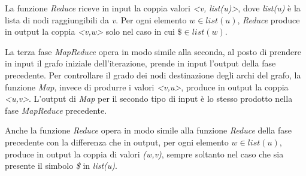 \documentclass[LaM,binding=0.6cm]{sapthesis}
\begin{document}
La funzione \textit{Reduce} riceve in input la coppia valori \textit{<v, list(u)>}, dove \textit{list(u)} è la lista di nodi raggiungibili da \textit{v}. Per ogni elemento \textit{$w \in list(u)$}, \textit{Reduce} produce in output la coppia \textit{<v,w>} solo nel caso in cui $\$ \in list(w)$. 

La terza fase \textit{MapReduce} opera in modo simile alla seconda, al posto di prendere in input il grafo iniziale dell'iterazione, prende in input l'output della fase precedente. Per controllare il grado dei nodi destinazione degli archi del grafo, la funzione \textit{Map}, invece di produrre i valori \textit{<v,u>}, produce in output la coppia \textit{<u,v>}. L'output di \textit{Map} per il secondo tipo di input è lo stesso prodotto nella fase \textit{MapReduce} precedente.

Anche la funzione \textit{Reduce} opera in modo simile alla funzione \textit{Reduce} della fase precedente con la differenza che in output, per ogni elemento \textit{$w \in list(u)$}, produce in output la coppia di valori \textit{(w,v)}, sempre soltanto nel caso che sia presente il simbolo \textit{\$} in \textit{list(u)}.


\begin{minipage}{\linewidth}

\end{minipage}
\begin{minipage}{\linewidth}

\end{minipage}
\end{document}
